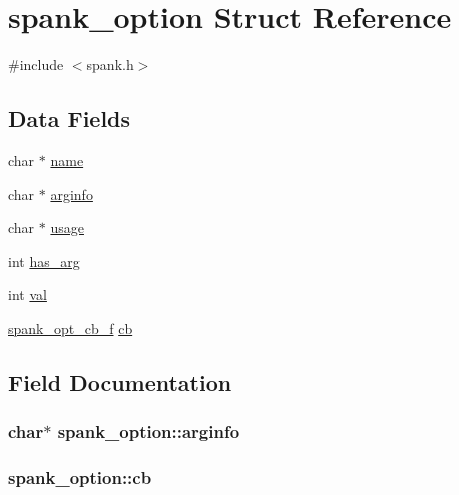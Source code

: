 \hypertarget{structspank__option}{}\section{spank\+\_\+option Struct Reference}
\label{structspank__option}


{\ttfamily \#include $<$spank.\+h$>$}

\subsection*{Data Fields}
\begin{DoxyCompactItemize}
\item 
char $\ast$ \hyperlink{structspank__option_a111bd6e521a3012ba63b9040ae08324a}{name}
\item 
char $\ast$ \hyperlink{structspank__option_afc78d6e50d706e77bb90a483dec629b7}{arginfo}
\item 
char $\ast$ \hyperlink{structspank__option_a16d469d2931e7dd3b70abce25596a247}{usage}
\item 
int \hyperlink{structspank__option_af8483ab4b244fe4ef4298696c8599896}{has\+\_\+arg}
\item 
int \hyperlink{structspank__option_ae39b3949758fbf1b27a0055f001c67b5}{val}
\item 
\hyperlink{spank_8h_a6a2cd7e061d72b335a76340e786486fa}{spank\+\_\+opt\+\_\+cb\+\_\+f} \hyperlink{structspank__option_a9f3d0b72df27bfbca78bedcfbd783741}{cb}
\end{DoxyCompactItemize}


\subsection{Field Documentation}
\subsubsection[{\texorpdfstring{arginfo}{arginfo}}]{\setlength{\rightskip}{0pt plus 5cm}char$\ast$ spank\+\_\+option\+::arginfo}\hypertarget{structspank__option_afc78d6e50d706e77bb90a483dec629b7}{}\label{structspank__option_afc78d6e50d706e77bb90a483dec629b7}
\subsubsection[{\texorpdfstring{cb}{cb}}]{ spank\+\_\+option\+::cb}\hypertarget{structspank__option_a9f3d0b72df27bfbca78bedcfbd783741}{}\label{structspank__option_a9f3d0b72df27bfbca78bedcfbd783741}
